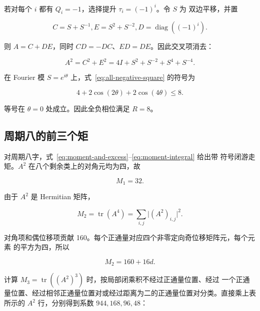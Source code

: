 若对每个 \(i\) 都有 \(Q_i=-1\)，选择提升 \(\tau_i=(-1)^i\)。令 \(S\) 为
双边平移，并置

\begin{equation}
C=S+S^{-1},       E=S^{2}+S^{-2},       D=\operatorname{diag}((-1)^i).
\end{equation}

则 \(A=C+DE\)，同时 \(CD=-DC\)、\(ED=DE\)。因此交叉项消去：

\begin{equation}
\label{eq:all-negative-square}
A^{2}=C^{2}+E^{2}=4I+S^{2}+S^{-2}+S^{4}+S^{-4}.
\end{equation}

在 Fourier 模 \(S=e^{i\theta}\) 上，式~\eqref{eq:all-negative-square} 的符号为

\begin{equation}
\label{eq:all-negative-dispersion}
4+2\cos(2\theta)+2\cos(4\theta)\leq 8.
\end{equation}

等号在 \(\theta=0\) 处成立。因此全负相位满足 \(R=8\)。

\subsection{周期八的前三个矩}

对周期八字，式~\eqref{eq:moment-and-excess}--\eqref{eq:moment-integral} 给出带
符号闭游走矩。\(A^2\) 在八个剩余类上的对角元均为四，故

\begin{equation}
\label{eq:period-eight-first-moment}
M_{1}=32.
\end{equation}

由于 \(A^2\) 是 Hermitian 矩阵，

\begin{equation}
M_{2}=\operatorname{tr}(A^{4})=\sum_{i,j}\lvert (A^{2})_{i,j}\rvert^{2}.
\end{equation}

对角项和偶位移项贡献 160。每个正通量对应四个非零定向奇位移矩阵元，每个元素
的平方为四，所以

\begin{equation}
\label{eq:period-eight-second-moment}
M_{2}=160+16d.
\end{equation}

计算 \(M_3=\operatorname{tr}((A^2)^3)\) 时，按局部闭乘积不经过正通量位置、经过
一个正通量位置、经过相邻正通量位置对或经过距离为二的正通量位置对分类。直接乘上表所示的
\(A^2\) 行，分别得到系数 \(944,168,96,48\)：

